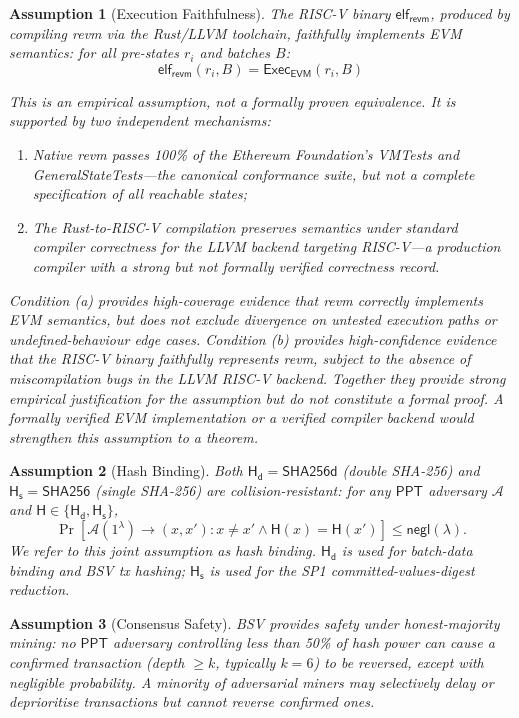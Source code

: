 \documentclass[11pt,a4paper]{article}
\newtheorem{assumption}{Assumption}[section]
\newcommand{\negl}{\mathsf{negl}}
\newcommand{\PPT}{\mathsf{PPT}}
\newcommand{\Adv}{\mathcal{A}}
\newcommand{\Hashd}{\mathsf{H_d}}        %
\newcommand{\Hashs}{\mathsf{H_s}}        %
\newcommand{\Exec}{\mathsf{Exec}}
\newcommand{\revm}{\textsf{revm}}
\newcommand{\EVM}{\mathsf{EVM}}
\begin{document}
\begin{assumption}[Execution Faithfulness]\label{ass:evm}
The RISC-V binary $\mathsf{elf}_{\revm}$, produced by compiling \revm{} via the Rust/LLVM toolchain, faithfully implements EVM semantics: for all pre-states $r_i$ and batches $B$:
\[
    \mathsf{elf}_{\revm}(r_i, B) = \Exec_{\EVM}(r_i, B)
\]

\emph{This is an empirical assumption, not a formally proven equivalence.} It is supported by two independent mechanisms:
\begin{enumerate}[nosep,label=(\alph*)]
    \item Native \revm{} passes 100\% of the Ethereum Foundation's VMTests and GeneralStateTests---the canonical conformance suite, but not a complete specification of all reachable states;
    \item The Rust-to-RISC-V compilation preserves semantics under standard compiler correctness for the LLVM backend targeting RISC-V---a production compiler with a strong but not formally verified correctness record.
\end{enumerate}
Condition (a) provides high-coverage evidence that \revm{} correctly implements EVM semantics, but does not exclude divergence on untested execution paths or undefined-behaviour edge cases. Condition (b) provides high-confidence evidence that the RISC-V binary faithfully represents \revm{}, subject to the absence of miscompilation bugs in the LLVM RISC-V backend. Together they provide strong empirical justification for the assumption but do not constitute a formal proof. A formally verified EVM implementation or a verified compiler backend would strengthen this assumption to a theorem.
\end{assumption}

\begin{assumption}[Hash Binding]\label{ass:cr}
Both $\Hashd = \mathsf{SHA256d}$ (double SHA-256) and $\Hashs = \mathsf{SHA256}$ (single SHA-256) are collision-resistant: for any $\PPT$ adversary $\Adv$ and $\mathsf{H} \in \{\Hashd, \Hashs\}$,
\[
    \Pr\!\left[\Adv(1^\lambda) \to (x, x') : x \neq x' \wedge \mathsf{H}(x) = \mathsf{H}(x')\right] \leq \negl(\lambda).
\]
We refer to this joint assumption as \emph{hash binding}. $\Hashd$ is used for batch-data binding and BSV tx hashing; $\Hashs$ is used for the SP1 committed-values-digest reduction.
\end{assumption}

\begin{assumption}[Consensus Safety]\label{ass:bsv-safety}
BSV provides safety under honest-majority mining: no $\PPT$ adversary controlling less than 50\% of hash power can cause a confirmed transaction (depth $\geq k$, typically $k=6$) to be reversed, except with negligible probability. A minority of adversarial miners may selectively delay or deprioritise transactions but cannot reverse confirmed ones.
\end{assumption}
\end{document}

